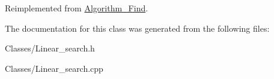 Reimplemented from \hyperlink{class_algorithm___find_aabdd8c1d9dba0d5482382902def6eae8}{Algorithm\-\_\-\-Find}.



The documentation for this class was generated from the following files\-:\begin{DoxyCompactItemize}
\item 
Classes/Linear\-\_\-search.\-h\item 
Classes/Linear\-\_\-search.\-cpp\end{DoxyCompactItemize}
